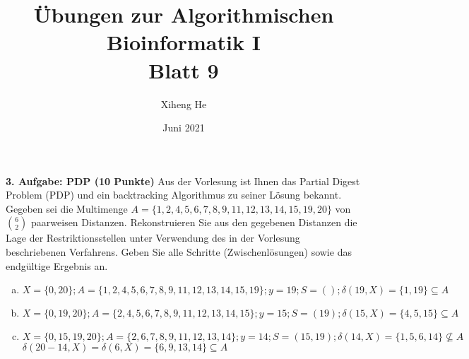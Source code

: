 \documentclass{article}
\title{Übungen zur Algorithmischen Bioinformatik I\\
Blatt 9}
\author{Xiheng He }
\date{Juni 2021}
\begin{document}
\maketitle
\begin{flushleft}
\textbf{3. Aufgabe: PDP (10 Punkte)}
Aus der Vorlesung ist Ihnen das Partial Digest Problem (PDP) und ein backtracking Algorithmus
zu seiner Lösung bekannt. Gegeben sei die Multimenge
\newline
$A = \{1, 2, 4, 5, 6, 7, 8, 9, 11, 12, 13, 14, 15, 19, 20\}$ von $\binom{6}{2}$ paarweisen Distanzen.
Rekonstruieren Sie aus den gegebenen Distanzen die Lage der Restriktionsstellen unter Verwendung des in der Vorlesung
beschriebenen Verfahrens.
\newline
Geben Sie alle Schritte (Zwischenlösungen) sowie das endgültige Ergebnis an. 
\newline
\begin{enumerate}[(a)]
    \item $X = \{0,20\};A = \{1,2,4,5,6,7,8,9,11,12,13,14,15,19\};y = 19; S = (); \delta (19,X) = \{1,19\} \subseteq A$
    \newline \\
    \item $X = \{0,19,20\};A = \{2,4,5,6,7,8,9,11,12,13,14,15\};y = 15; S = (19); \delta (15,X) = \{4,5,15\} \subseteq A$
    \newline \\
    \item $X = \{0,15,19,20\};A = \{2,6,7,8,9,11,12,13,14\};y = 14; S = (15,19); \delta (14,X) = \{1,5,6,14\} \not \subseteq A$ \\
    $\delta (20 - 14,X) = \delta (6,X) = \{6,9,13,14\} \subseteq A$

\end{enumerate}
\end{flushleft}
\end{document}
